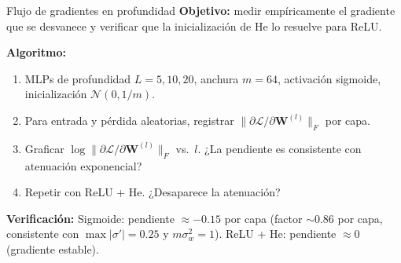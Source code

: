 \begin{ejerciciocomp}{Flujo de gradientes en profundidad}
\label{ejcomp:vanishing}
\textbf{Objetivo:} medir empíricamente el gradiente que se desvanece y
verificar que la inicialización de He lo resuelve para ReLU.

\medskip\noindent\textbf{Algoritmo:}
\begin{enumerate}
  \item MLPs de profundidad $L = 5, 10, 20$, anchura $m = 64$, activación
        sigmoide, inicialización $\mathcal{N}(0, 1/m)$.
  \item Para entrada y pérdida aleatorias, registrar
        $\|\partial\mathcal{L}/\partial\bm{W}^{(l)}\|_F$ por capa.
  \item Graficar
        $\log\|\partial\mathcal{L}/\partial\bm{W}^{(l)}\|_F$ vs.\ $l$.
        ¿La pendiente es consistente con atenuación exponencial?
  \item Repetir con ReLU + He. ¿Desaparece la atenuación?
\end{enumerate}

\medskip\noindent\textbf{Verificación:}
Sigmoide: pendiente $\approx -0.15$ por capa (factor $\sim 0.86$ por capa,
consistente con $\max|\sigma'| = 0.25$ y $m\sigma_w^2 = 1$).
ReLU + He: pendiente $\approx 0$ (gradiente estable).
\end{ejerciciocomp}

